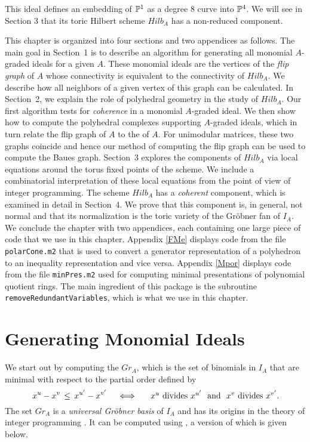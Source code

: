 This ideal defines an embedding of
$\P^1$ as a degree $8$ curve into $\P^4$. We will see in Section 3
that its toric Hilbert scheme $Hilb_A$ has a non-reduced component.

This chapter is organized into four sections and two appendices as
follows. The main goal in Section~1 is to describe an algorithm for
generating all monomial $A$-graded ideals for a given $A$. These
monomial ideals are the vertices of the {\em flip graph} of $A$ whose
connectivity is equivalent to the connectivity of $Hilb_A$. We
describe how all neighbors of a given vertex of this graph can be
calculated. In Section~2, we explain the role of polyhedral geometry
in the study of $Hilb_A$. Our first algorithm tests for {\em
coherence} in a monomial $A$-graded ideal. We then show how to compute
the polyhedral complexes supporting $A$-graded ideals, which in turn
relate the flip graph of $A$ to the {\em {}} of $A$.  For
unimodular matrices, these two graphs coincide and hence our method of
computing the flip graph can be used to compute the Baues
graph. Section~3 explores the components of $Hilb_A$ via local
equations around the torus fixed points of the scheme. We include a
combinatorial interpretation of these local equations from the point
of view of integer programming.  The scheme $Hilb_A$ has a {\em
coherent} component, which is examined in detail in Section~4. We prove
that this component is, in general, not normal and that its
normalization is the toric variety of the Gr\"obner fan of $I_A$. We
conclude the chapter with two appendices, each containing one large
piece of \Mtwo code that we use in this chapter. Appendix \ref{FMe} displays
code from the \Mtwo file {\tt polarCone.m2} that is used to convert a generator
representation of a polyhedron to an inequality representation and
vice versa. Appendix \ref{Mpor} displays code from the file {\tt minPres.m2} used for computing minimal
presentations of polynomial quotient rings. The main ingredient of
this package is the subroutine {\tt removeRedundantVariables}, which is
what we use in this chapter.

\section{Generating Monomial Ideals}
We start out by computing the {\it {}} $Gr_A$, which is the
set of binomials in $I_A$ that are minimal with respect to the
partial order defined by $$\, x^u - x^v \,\leq\, x^{u'} - x^{v'} \quad \iff
\quad \hbox{ $x^u$ divides $x^{u'}$ \ and \ $x^v$ divides $x^{v'}$.}
$$ The set $Gr_A$ is a {\em universal Gr\"obner basis} of $I_A$ and
has its origins in the theory of integer programming \cite{HS:Gra}. It
can be computed using \cite[Algorithm 7.2]{HS:St2}, a \Mtwo version of
which is given below.

